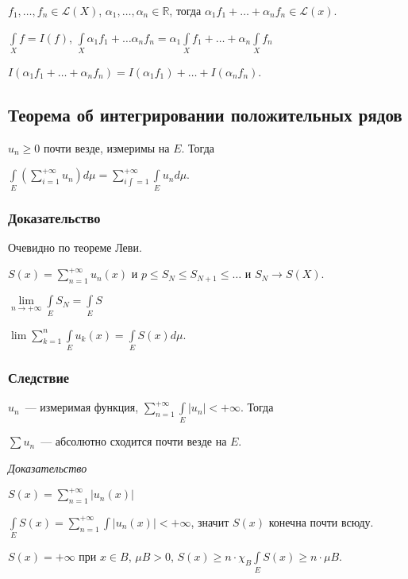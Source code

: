\documentclass{article}
\begin{document}
        $f_1, \ldots, f_n \in \mathcal{L}(X)$, $\alpha_1, \ldots, \alpha_n \in \mathbb{R}$, тогда $\alpha_1 f_1 + \ldots + \alpha_n f_n \in \mathcal{L}(x)$.
        
        $\int\limits_{X} f = I(f)$, $\int\limits_X \alpha_1 f_1 + \ldots \alpha_n f_n = \alpha_1 \int\limits_{X} f_1 + \ldots + \alpha_n \int\limits_{X} f_n$
        
        $I(\alpha_1 f_1 + \ldots + \alpha_n f_n) = I(\alpha_1 f_1) + \ldots + I(\alpha_n f_n)$.
        
    \subsection{Теорема об интегрировании положительных рядов}
    
        $u_n \geqslant 0$ почти везде, измеримы на $E$. Тогда
        
        $\int\limits_{E} \left( \sum\limits^{+\infty}_{i = 1} u_n \right) d \mu = \sum\limits^{+\infty}_{i \int= 1} \int\limits_{E} u_n d \mu$.
        
        \subsubsection{Доказательство}
        
            Очевидно по теореме Леви.
            
            $S(x) = \sum\limits^{+\infty}_{n = 1} u_n(x)$ и $p \leqslant S_N \leqslant S_{N + 1} \leqslant \ldots$ и $S_N \rightarrow S(X)$.
            
            $\lim\limits_{n \rightarrow +\infty} \int\limits_{E} S_N = \int\limits_{E} S$
            
            $\lim \sum\limits^n_{k = 1} \int\limits_{E} u_k(x) = \int\limits_{E} S(x) d \mu$.
            
        \subsubsection{Следствие}
        
            $u_n$~--- измеримая функция, $\sum\limits^{+\infty}_{n = 1} \int\limits_{E} | u_n | < +\infty$. Тогда
            
            $\sum u_n$~--- абсолютно сходится почти везде на $E$.
            
            \textit{Доказательство}
            
                $S(x) = \sum\limits^{+\infty}_{n = 1} | u_n(x) |$
                
                $\int\limits_{E} S(x) = \sum\limits^{+\infty}_{n = 1} \int\limits | u_n(x) | < +\infty$, значит $S(x)$ конечна почти всюду.
                
                $S(x) = +\infty$ при $x \in B$, $\mu B > 0$, $S(x) \geqslant n \cdot \chi_{B} \int\limits_{E} S(x) \geqslant n \cdot \mu B$.
                
        
\end{document}
